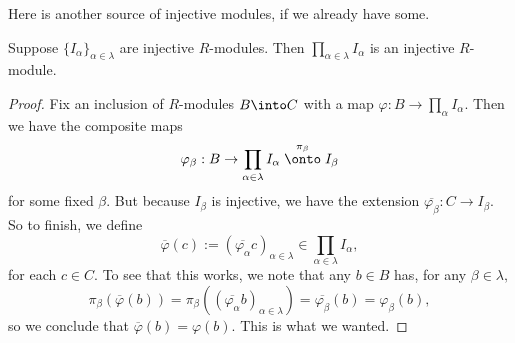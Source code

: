 Here is another source of injective modules, if we already have some.
\begin{proposition}
	Suppose $\{I_\alpha\}_{\alpha\in\lambda}$ are injective $R$-modules. Then $\prod_{\alpha\in\lambda}I_\alpha$ is an injective $R$-module.
\end{proposition}
\begin{proof}
	Fix an inclusion of $R$-modules $B\into C$ with a map $\varphi:B\to\prod_{\alpha} I_\alpha.$ Then we have the composite maps
	\[\varphi_\beta:B\to\prod_{\alpha\in\lambda}I_\alpha\stackrel{\pi_\beta}\onto I_\beta\]
	for some fixed $\beta.$ But because $I_\beta$ is injective, we have the extension $\overline{\varphi_\beta}:C\to I_\beta.$ So to finish, we define
	\[\overline\varphi(c):=(\overline{\varphi_\alpha}c)_{\alpha\in\lambda}\in\prod_{\alpha\in\lambda}I_\alpha,\]
	for each $c\in C.$ To see that this works, we note that any $b\in B$ has, for any $\beta\in\lambda,$
	\[\pi_\beta(\overline\varphi(b))=\pi_\beta\left((\overline{\varphi_\alpha}b)_{\alpha\in\lambda}\right)=\overline{\varphi_\beta}(b)=\varphi_\beta(b),\]
	so we conclude that $\overline\varphi(b)=\varphi(b).$ This is what we wanted.
\end{proof}

